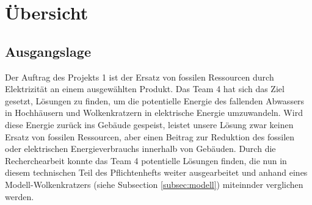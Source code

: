 \section{Übersicht} \label{sec:uebersicht}
\subsection{Ausgangslage}
Der Auftrag des Projekts 1 ist der Ersatz von fossilen Ressourcen durch Elektrizität an einem ausgewählten Produkt. Das Team 4 hat sich das Ziel gesetzt, Lösungen zu finden, um die potentielle Energie des fallenden Abwassers in Hochhäusern und Wolkenkratzern in elektrische Energie umzuwandeln. Wird diese Energie zurück ins Gebäude gespeist, leistet unsere Lösung zwar keinen Ersatz von fossilen Ressourcen, aber einen Beitrag zur Reduktion des fossilen oder elektrischen Energieverbrauchs innerhalb von Gebäuden.
Durch die Recherchearbeit konnte das Team 4 potentielle Lösungen finden, die nun in diesem technischen Teil des Pflichtenhefts weiter ausgearbeitet und anhand eines Modell-Wolkenkratzers (siehe Subsection \ref{subsec:modell}) miteinnder verglichen werden.
\renewcommand\arraystretch{1.5}
\newcommand{\T}{\rule{0pt}{3ex}}       %
\newcommand{\B}{\rule[-2.5ex]{0pt}{0pt}} %
